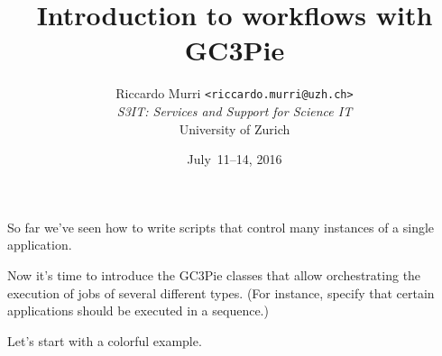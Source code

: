 \documentclass[english,serif,mathserif,xcolor=pdftex,dvipsnames,table]{beamer}
\title[Workflows]{%
  Introduction to workflows with GC3Pie
}
\author[R. Murri, S3IT UZH]{%
  Riccardo Murri \texttt{<riccardo.murri@uzh.ch>}
  \\[1ex]
  \emph{S3IT: Services and Support for Science IT}
  \\[1ex]
  University of Zurich
}
\date{July~11--14, 2016}
\begin{document}
\maketitle









\begin{frame}

  So far we've seen how to write scripts that control many instances of
  a single application.

  \+
  Now it's time to introduce the GC3Pie classes that allow
  orchestrating the execution of jobs of several different types. (For
  instance, specify that certain applications should be executed in a
  sequence.)

  \+
  Let's start with a colorful example.
\end{frame}
\end{document}
